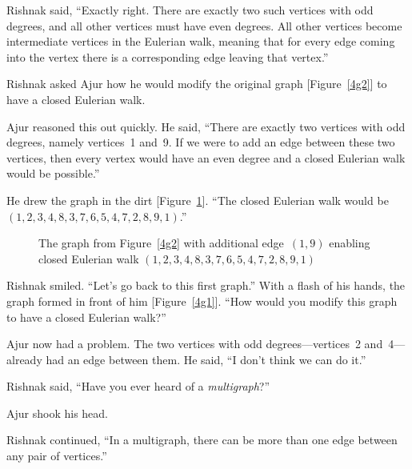 Rishnak said, ``Exactly right. There are exactly two such vertices with odd degrees, and all other vertices must have even degrees. All other vertices become intermediate vertices in the Eulerian walk, meaning that for every edge coming into the vertex there is a corresponding edge leaving that vertex.''

Rishnak asked Ajur how he would modify the original graph [Figure~\ref{4g2}] to have a closed Eulerian walk.

Ajur reasoned this out quickly. He said, ``There are exactly two vertices with odd degrees, namely vertices~1 and~9. If we were to add an edge between these two vertices, then every vertex would have an even degree and a closed Eulerian walk would be possible.''

He drew the graph in the dirt [Figure~\ref{4g255}]. ``The closed Eulerian walk would be $(1,2,3,4,8,3,7,6,5,4,7,2,8,9,1)$.''

\begin{figure}
\begin{center}
\caption{The graph from Figure~\ref{4g2} with additional edge~$(1,9)$ enabling closed Eulerian walk $(1,2,3,4,8,3,7,6,5,4,7,2,8,9,1)$}\label{4g255}
\end{center}
\end{figure}

Rishnak smiled. ``Let's go back to this first graph.'' With a flash of his hands, the graph formed in front of him [Figure~\ref{4g1}]. ``How would you modify this graph to have a closed Eulerian walk?''

Ajur now had a problem. The two vertices with odd degrees---vertices~2 and~4---already had an edge between them. He said, ``I don't think we can do it.''

Rishnak said, ``Have you ever heard of a \textit{multigraph}?''

Ajur shook his head.

Rishnak continued, ``In a multigraph, there can be more than one edge between any pair of vertices.''

